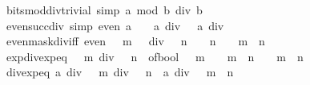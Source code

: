 \begin{isabellebody}
\ \ \ \ \ bits{\isacharunderscore}{\kern0pt}mod{\isacharunderscore}{\kern0pt}div{\isacharunderscore}{\kern0pt}trivial\ {\isacharbrackleft}{\kern0pt}simp{\isacharbrackright}{\kern0pt}{\isacharcolon}{\kern0pt}\ {\isacartoucheopen}a\ mod\ b\ div\ b\ {\isacharequal}{\kern0pt}\ {}{\isacartoucheclose}\isanewline
\ \ \ \ \ even{\isacharunderscore}{\kern0pt}succ{\isacharunderscore}{\kern0pt}div{\isacharunderscore}{\kern0pt}{}\ {\isacharbrackleft}{\kern0pt}simp{\isacharbrackright}{\kern0pt}{\isacharcolon}{\kern0pt}\ {\isacartoucheopen}even\ a\ {\isasymLongrightarrow}\ {\isacharparenleft}{\kern0pt}{}\ {\isacharplus}{\kern0pt}\ a{\isacharparenright}{\kern0pt}\ div\ {}\ {\isacharequal}{\kern0pt}\ a\ div\ {}{\isacartoucheclose}\isanewline
\ \ \ \ \ even{\isacharunderscore}{\kern0pt}mask{\isacharunderscore}{\kern0pt}div{\isacharunderscore}{\kern0pt}iff{\isacharcolon}{\kern0pt}\ {\isacartoucheopen}even\ {\isacharparenleft}{\kern0pt}{\isacharparenleft}{\kern0pt}{}\ {\isacharcircum}{\kern0pt}\ m\ {\isacharminus}{\kern0pt}\ {}{\isacharparenright}{\kern0pt}\ div\ {}\ {\isacharcircum}{\kern0pt}\ n{\isacharparenright}{\kern0pt}\ {\isasymlongleftrightarrow}\ {}\ {\isacharcircum}{\kern0pt}\ n\ {\isacharequal}{\kern0pt}\ {}\ {\isasymor}\ m\ {\isasymle}\ n{\isacartoucheclose}\isanewline
\ \ \ \ \ exp{\isacharunderscore}{\kern0pt}div{\isacharunderscore}{\kern0pt}exp{\isacharunderscore}{\kern0pt}eq{\isacharcolon}{\kern0pt}\ {\isacartoucheopen}{}\ {\isacharcircum}{\kern0pt}\ m\ div\ {}\ {\isacharcircum}{\kern0pt}\ n\ {\isacharequal}{\kern0pt}\ of{\isacharunderscore}{\kern0pt}bool\ {\isacharparenleft}{\kern0pt}{}\ {\isacharcircum}{\kern0pt}\ m\ {\isasymnoteq}\ {}\ {\isasymand}\ m\ {\isasymge}\ n{\isacharparenright}{\kern0pt}\ {\isacharasterisk}{\kern0pt}\ {}\ {\isacharcircum}{\kern0pt}\ {\isacharparenleft}{\kern0pt}m\ {\isacharminus}{\kern0pt}\ n{\isacharparenright}{\kern0pt}{\isacartoucheclose}\isanewline
\ \ \ \ \ div{\isacharunderscore}{\kern0pt}exp{\isacharunderscore}{\kern0pt}eq{\isacharcolon}{\kern0pt}\ {\isacartoucheopen}a\ div\ {}\ {\isacharcircum}{\kern0pt}\ m\ div\ {}\ {\isacharcircum}{\kern0pt}\ n\ {\isacharequal}{\kern0pt}\ a\ div\ {}\ {\isacharcircum}{\kern0pt}\ {\isacharparenleft}{\kern0pt}m\ {\isacharplus}{\kern0pt}\ n{\isacharparenright}{\kern0pt}{\isacartoucheclose}\isanewline

\end{isabellebody}
